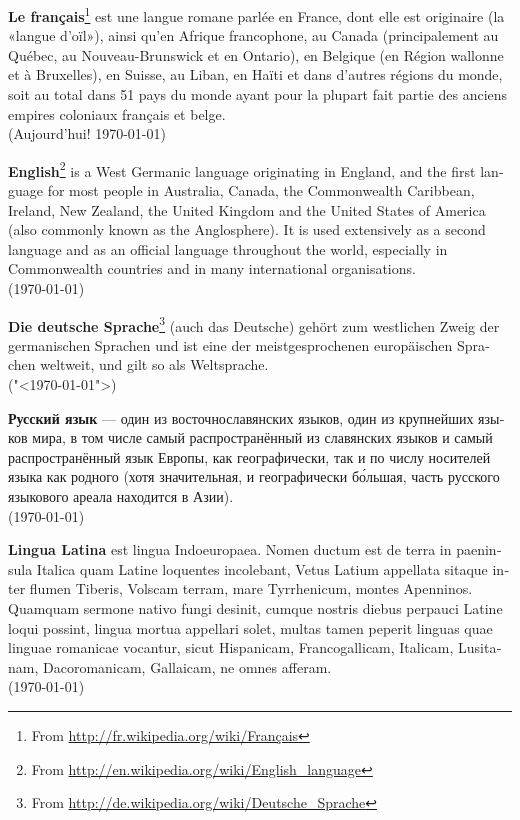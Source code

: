 \documentclass[a4paper]{article}
\begin{document}
\noindent
\textbf{Le français}\footnote{ From \url{http://fr.wikipedia.org/wiki/Français}} est une langue romane parlée en France, dont elle est originaire (la «langue d'oïl»), ainsi qu'en Afrique francophone, au Canada (principalement au Québec, au Nouveau-Brunswick et en Ontario), en Belgique (en Région wallonne et à Bruxelles), en Suisse, au Liban, en Haïti et dans d'autres régions du monde, soit au total dans 51 pays du monde ayant pour la plupart fait partie des anciens empires coloniaux français et belge. \\
(Aujourd'hui! \today)

\begin{english}
\textbf{English}\footnote{From \url{http://en.wikipedia.org/wiki/English_language}} is a West Germanic language originating in England, and the first language for most people in Australia, Canada, the Commonwealth Caribbean, Ireland, New Zealand, the United Kingdom and the United States of America (also commonly known as the Anglosphere). It is used extensively as a second language and as an official language throughout the world, especially in Commonwealth countries and in many international organisations. \\
(\today)
\end{english}

\begin{german}
\textbf{Die deutsche Sprache}\footnote{ From \url{http://de.wikipedia.org/wiki/Deutsche_Sprache}} (auch das Deutsche) gehört zum westlichen Zweig der germanischen Sprachen und ist eine der meistgesprochenen europäischen Sprachen weltweit, und gilt so als Weltsprache.\\
("<\today">)
\end{german}

\begin{russian}
\textbf{Русский язык} — один из восточнославянских языков, один из крупнейших языков мира, в том числе самый распространённый из славянских языков и самый распространённый язык Европы, как географически, так и по числу носителей языка как родного (хотя значительная, и географически бо́льшая, часть русского языкового ареала находится в Азии).	\\
(\today)
\end{russian}

\begin{latin}
\textbf{Lingua Latina} est lingua Indoeuropaea. Nomen ductum est de terra in paeninsula Italica quam Latine loquentes incolebant, Vetus Latium appellata sitaque inter flumen Tiberis, Volscam terram, mare Tyrrhenicum, montes Apenninos. 
Quamquam sermone nativo fungi desinit, cumque nostris diebus perpauci Latine loqui possint, lingua mortua appellari solet, multas tamen peperit linguas quae linguae romanicae vocantur, sicut Hispanicam, Francogallicam, Italicam, Lusitanam, Dacoromanicam, Gallaicam, ne omnes afferam. \\
(\today) 
\end{latin}
\end{document}

